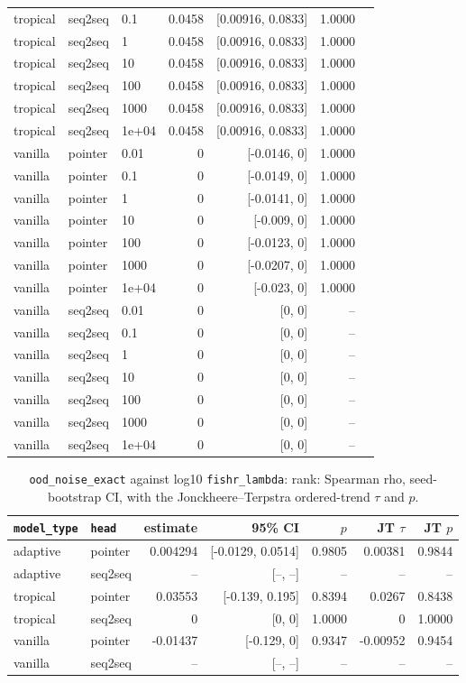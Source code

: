 \documentclass[10pt]{article}
\begin{document}
{\begin{longtable}{lllrrrl}
tropical & seq2seq & 0.1 & 0.0458 & [0.00916, 0.0833] & 1.0000 & \\
tropical & seq2seq & 1 & 0.0458 & [0.00916, 0.0833] & 1.0000 & \\
tropical & seq2seq & 10 & 0.0458 & [0.00916, 0.0833] & 1.0000 & \\
tropical & seq2seq & 100 & 0.0458 & [0.00916, 0.0833] & 1.0000 & \\
tropical & seq2seq & 1000 & 0.0458 & [0.00916, 0.0833] & 1.0000 & \\
tropical & seq2seq & 1e+04 & 0.0458 & [0.00916, 0.0833] & 1.0000 & \\
vanilla & pointer & 0.01 & 0 & [-0.0146, 0] & 1.0000 & \\
vanilla & pointer & 0.1 & 0 & [-0.0149, 0] & 1.0000 & \\
vanilla & pointer & 1 & 0 & [-0.0141, 0] & 1.0000 & \\
vanilla & pointer & 10 & 0 & [-0.009, 0] & 1.0000 & \\
vanilla & pointer & 100 & 0 & [-0.0123, 0] & 1.0000 & \\
vanilla & pointer & 1000 & 0 & [-0.0207, 0] & 1.0000 & \\
vanilla & pointer & 1e+04 & 0 & [-0.023, 0] & 1.0000 & \\
vanilla & seq2seq & 0.01 & 0 & [0, 0] & -- & \\
vanilla & seq2seq & 0.1 & 0 & [0, 0] & -- & \\
vanilla & seq2seq & 1 & 0 & [0, 0] & -- & \\
vanilla & seq2seq & 10 & 0 & [0, 0] & -- & \\
vanilla & seq2seq & 100 & 0 & [0, 0] & -- & \\
vanilla & seq2seq & 1000 & 0 & [0, 0] & -- & \\
vanilla & seq2seq & 1e+04 & 0 & [0, 0] & -- & \\
\bottomrule
\end{longtable}
}

{\small
\begin{longtable}{llrrrrr}
\caption{\texttt{ood\_noise\_exact} against log10 \texttt{fishr\_lambda}: rank: Spearman rho, seed-bootstrap CI, with the Jonckheere--Terpstra ordered-trend $\tau$ and $p$.}\label{tab:trend-ood_noise_exact}\\
\toprule
\texttt{model\_type} & \texttt{head} & estimate & 95\% CI & $p$ & JT $\tau$ & JT $p$\\
\midrule
\endhead
adaptive & pointer & 0.004294 & [-0.0129, 0.0514] & 0.9805 & 0.00381 & 0.9844\\
adaptive & seq2seq & -- & [--, --] & -- & -- & --\\
tropical & pointer & 0.03553 & [-0.139, 0.195] & 0.8394 & 0.0267 & 0.8438\\
tropical & seq2seq & 0 & [0, 0] & 1.0000 & 0 & 1.0000\\
vanilla & pointer & -0.01437 & [-0.129, 0] & 0.9347 & -0.00952 & 0.9454\\
vanilla & seq2seq & -- & [--, --] & -- & -- & --\\
\bottomrule
\end{longtable}
}
\end{document}
